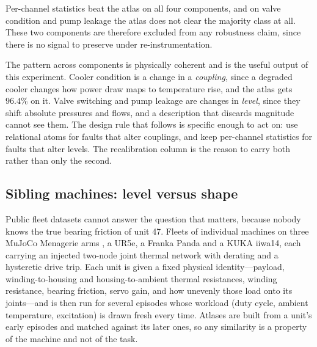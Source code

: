 \documentclass[11pt]{article}
\begin{document}
Per-channel statistics beat the atlas on all four components, and on valve
condition and pump leakage the atlas does not clear the majority class at all.
These two components are therefore excluded from any robustness claim, since
there is no signal to preserve under re-instrumentation.

The pattern across components is physically coherent and is the useful output
of this experiment. Cooler condition is a change in a \emph{coupling}, since a
degraded cooler changes how power draw maps to temperature rise, and the atlas
gets $96.4\%$ on it. Valve switching and pump leakage are changes in
\emph{level}, since they shift absolute pressures and flows, and a description
that discards magnitude cannot see them. The design rule that follows is
specific enough to act on: use relational atoms for faults that alter
couplings, and keep per-channel statistics for faults that alter levels. The
recalibration column is the reason to carry both rather than only the second.

\subsection{Sibling machines: level versus shape}
\label{sec:fleet}

Public fleet datasets cannot answer the question that matters, because nobody
knows the true bearing friction of unit 47. Fleets of
individual machines on three MuJoCo Menagerie arms \cite{todorov2012,guo2022},
a UR5e, a Franka Panda and a KUKA iiwa14, each carrying an injected two-node
joint thermal network with derating and a hysteretic drive trip. Each unit is
given a fixed physical identity---payload, winding-to-housing and
housing-to-ambient thermal resistances, winding resistance, bearing friction,
servo gain, and how unevenly those load onto its joints---and is then run for
several episodes whose workload (duty cycle, ambient temperature, excitation)
is drawn fresh every time. Atlases are built from a unit's early episodes and
matched against its later ones, so any similarity is a property of the machine
and not of the task.
\end{document}
